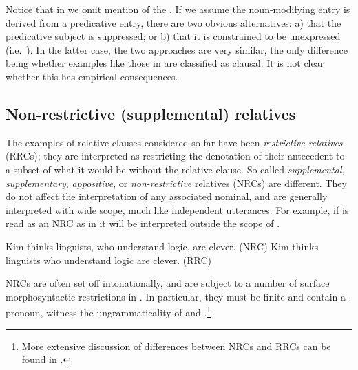 \documentclass[output=paper
 	        ,biblatex
                ,babelshorthands
                ,newtxmath
                ,draftmode
                ,colorlinks, citecolor=brown
]{langscibook}
\begin{document}
Notice that in  we omit mention of the . If we assume the
noun-modifying entry is derived from a predicative entry, there are two obvious
alternatives: a) that the predicative subject is suppressed; or b) that it is constrained
to be unexpressed (i.e.\ ). In the latter case, the two approaches are very
similar, the only difference being whether examples like those in  are
classified as clausal. It is not clear whether this has empirical consequences.

\subsection{Non-restrictive (supplemental) relatives}
\label{sec:rc-non-restr-suppl}

The examples of relative clauses considered so far have been \emph{restrictive relatives} (RRCs); they are
interpreted as restricting the denotation of their antecedent to a subset of what
it would be without the relative clause. So-called \emph{supplemental}, \emph{supplementary}, \emph{appositive}, or \emph{non-restrictive}
relatives (NRCs) are different. They do not affect the interpretation of any associated
nominal, and are generally interpreted with wide scope, much like independent
utterances. For example, if  is read as an NRC as in 
it will be interpreted outside the scope of .
\begin{exe}\ex\begin{xlist}\label{x:rc-106}
  \ex\label{x:rc-107} Kim thinks linguists, who understand logic, are clever. \hfill (NRC)
  \ex\label{x:rc-108} Kim thinks linguists who understand logic are clever. \hfill (RRC)
\end{xlist}\end{exe}
NRCs are often set off intonationally, and are subject to a number of surface
morphosyntactic restrictions in .  In particular, they must be finite and contain a
-pronoun, witness the ungrammaticality of  and
.\footnote{More extensive discussion of differences between NRCs and RRCs can
  be found in .}
\begin{exe}\ex\begin{xlist}
\end{xlist}\end{exe}
\end{document}
